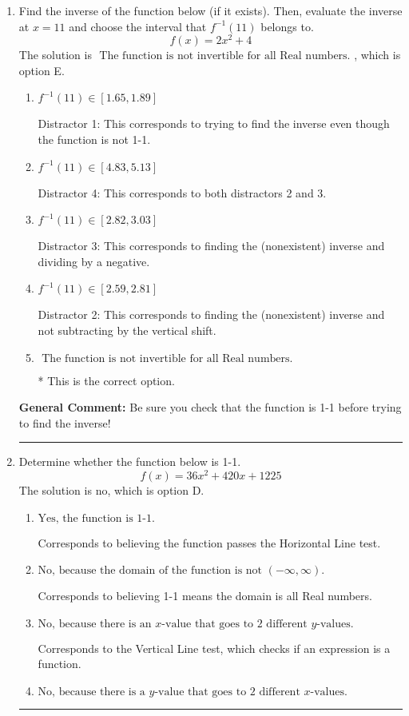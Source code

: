 \documentclass{extbook}[14pt]
\newcommand{\litem}[1]{\item #1

\rule{\textwidth}{0.4pt}}
\begin{document}
\begin{enumerate}\litem{
Find the inverse of the function below (if it exists). Then, evaluate the inverse at $x = 11$ and choose the interval that $f^{-1}(11)$ belongs to.
\[ f(x) = 2 x^2 + 4 \]The solution is \( \text{ The function is not invertible for all Real numbers. } \), which is option E.\begin{enumerate}[label=\Alph*.]
\item \( f^{-1}(11) \in [1.65, 1.89] \)

 Distractor 1: This corresponds to trying to find the inverse even though the function is not 1-1. 
\item \( f^{-1}(11) \in [4.83, 5.13] \)

 Distractor 4: This corresponds to both distractors 2 and 3.
\item \( f^{-1}(11) \in [2.82, 3.03] \)

 Distractor 3: This corresponds to finding the (nonexistent) inverse and dividing by a negative.
\item \( f^{-1}(11) \in [2.59, 2.81] \)

 Distractor 2: This corresponds to finding the (nonexistent) inverse and not subtracting by the vertical shift.
\item \( \text{ The function is not invertible for all Real numbers. } \)

* This is the correct option.
\end{enumerate}

\textbf{General Comment:} Be sure you check that the function is 1-1 before trying to find the inverse!
}
\litem{
Determine whether the function below is 1-1.
\[ f(x) = 36 x^2 + 420 x + 1225 \]The solution is \( \text{no} \), which is option D.\begin{enumerate}[label=\Alph*.]
\item \( \text{Yes, the function is 1-1.} \)

Corresponds to believing the function passes the Horizontal Line test.
\item \( \text{No, because the domain of the function is not $(-\infty, \infty)$.} \)

Corresponds to believing 1-1 means the domain is all Real numbers.
\item \( \text{No, because there is an $x$-value that goes to 2 different $y$-values.} \)

Corresponds to the Vertical Line test, which checks if an expression is a function.
\item \( \text{No, because there is a $y$-value that goes to 2 different $x$-values.} \)


\end{enumerate}}
\end{enumerate}
\end{document}

